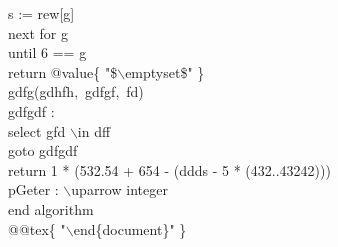 \tb \tb s := rew[g] \\
\tb \tb next for g \\
\tb until 6 == g \\
\tb return @value\{ "\$$\backslash$emptyset\$" \} \\
\tb gdfg(gdhfh$,$ gdfgf$,$ fd) \\
\tb gdfgdf : \\
\tb select gfd $\backslash$in dff \\
\tb goto gdfgdf \\
\tb return 1 * (532.54 + 654 - (ddds - 5 * (432..43242))) \\
\tb pGeter : $\backslash$uparrow integer \\
end algorithm \\
\tb @@tex\{ "$\backslash$end\{document\}" \}
